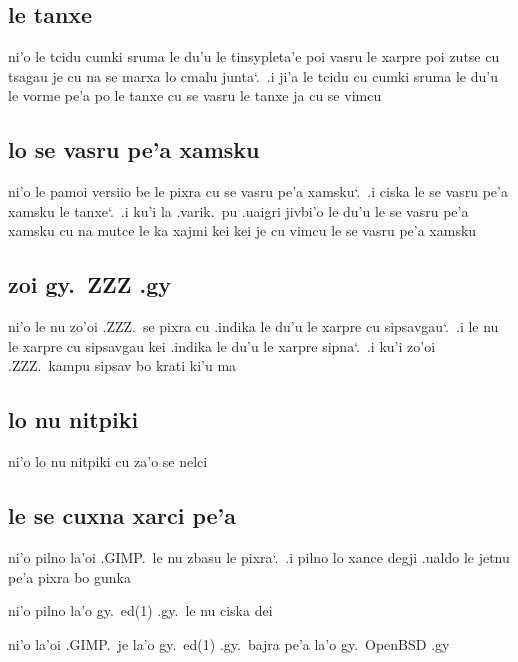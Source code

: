 \documentclass{report}
\newcommand\sds{\spacefactor\sfcode`.\ \space}
\begin{document}
\subsection{le tanxe}
ni'o le tcidu cumki sruma le du'u le tinsypleta'e poi vasru le xarpre poi zutse cu tsagau je cu na se marxa lo cmalu junta\sds  .i ji'a le tcidu cu cumki sruma le du'u le vorme pe'a po le tanxe cu se vasru le tanxe ja cu se vimcu

\subsection{lo se vasru pe'a xamsku}
ni'o le pamoi versiio be le pixra cu se vasru pe'a xamsku\sds  .i ciska le se vasru pe'a xamsku le tanxe\sds  .i ku'i la .varik.\ pu .uaigri jivbi'o le du'u le se vasru pe'a xamsku cu na mutce le ka xajmi kei kei je cu vimcu le se vasru pe'a xamsku

\subsection{zoi gy.\ ZZZ .gy}
ni'o le nu zo'oi .ZZZ.\ se pixra cu .indika le du'u le xarpre cu sipsavgau\sds  .i le nu le xarpre cu sipsavgau kei .indika le du'u le xarpre sipna\sds  .i ku'i zo'oi .ZZZ.\ kampu sipsav bo krati ki'u ma

\subsection{lo nu nitpiki}
ni'o lo nu nitpiki cu za'o se nelci

\subsection{le se cuxna xarci pe'a}
ni'o pilno la'oi .GIMP.\ le nu zbasu le pixra\sds  .i pilno lo xance degji .ualdo le jetnu pe'a pixra bo gunka

ni'o pilno la'o gy.\ ed(1) .gy.\ le nu ciska dei

ni'o la'oi .GIMP.\ je la'o gy.\ ed(1) .gy.\ bajra pe'a la'o gy.\ OpenBSD .gy
\end{document}
